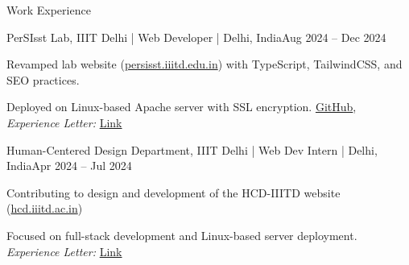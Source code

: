 \documentclass[10pt]{resume}
\begin{document}
\begin{rSection}{Work Experience}
\begin{rSubsection}{PerSIsst Lab, IIIT Delhi | Web Developer | Delhi, India}{Aug 2024 -- Dec 2024}
    \item Revamped lab website (\href{https://persisst.iiitd.edu.in}{persisst.iiitd.edu.in}) with TypeScript, TailwindCSS, and SEO practices.
    \item Deployed on Linux-based Apache server with SSL encryption. \href{https://github.com/kintsugi-programmer/PerSIsst-Lab}{GitHub}, \textit{Experience Letter:} \href{https://drive.google.com/file/d/1uVUchMiUUwhLph9rYhSjSyHx-VntRaQw/view?usp=sharing}{Link}
\end{rSubsection}



\begin{rSubsection}{Human-Centered Design Department, IIIT Delhi | Web Dev Intern | Delhi, India}{Apr 2024 -- Jul 2024}
    \item Contributing to design and development of the HCD-IIITD website (\href{https://hcd.iiitd.ac.in/}{hcd.iiitd.ac.in})
    \item Focused on full-stack development and Linux-based server deployment. \textit{Experience Letter:} \href{https://drive.google.com/file/d/1ZBmdpn35tOQ6O-hA4DlZQFGS6P-6t2TZ/view?usp=sharing}{Link}
\end{rSubsection}


\end{rSection}
\end{document}
